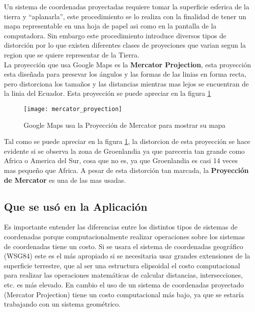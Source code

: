         Un sistema de coordenadas proyectadas requiere tomar la superficie esferica de la tierra y ``aplanarla'', este procedimiento se lo realiza con la finalidad de tener un mapa representable en una hoja de papel asi como en la pantalla de la computadora. Sin embargo este procedimiento introduce diversos tipos de distorci\'on por lo que existen diferentes clases de proyeciones que varian segun la region que se quiere representar de la Tierra.\\

        La proyecci\'on que usa Google Maps es la \textbf{Mercator Projection}, esta proyecci\'on esta dise\~nada para presevar los ángulos y las formas de las linias en forma recta, pero distorciona los tama\~nos y las distancias mientras mas lejos se encuentran de la linia del Ecuador. Esta proyecci\'on se puede apreciar en la figura \ref{fig:mercator_proyection}

        \begin{figure}[!hbp]
          \begin{center}
            \texttt{[image: mercator\_proyection]}
          \end{center}
          \caption[Sistema de coordenadas Proyectadas]{Google Maps usa la Proyección de Mercator para mostrar su mapa} 
          \label{fig:mercator_proyection}
        \end{figure}

        Tal como se puede apreciar en la figura \ref{fig:mercator_proyection}, la distorcion de esta proyecci\'on se hace evidente si se observa la zona de Groenlandia ya que pareceria tan grande como Africa o America del Sur, cosa que no es, ya que Groenlandia es casi 14 veces mas peque\~no que Africa. A pesar de esta distorci\'on tan marcada, la \textbf{Proyección de Mercator} es una de las mas usadas.
      \subsection{Que se us\'o en la Aplicaci\'on} %
      \label{sec:que_se_uso_en_la_aplicacion}
        Es importante entender las diferencias entre los distintos tipos de sistemas de coordenadas porque computacionalmente realizar operaciones sobre los sistemas de coordenadas tiene un costo.        
        Si se usara el sistema de coordenadas geográfico (WSG84) este es el más apropiado si se necesitaria usar grandes extensiones de la superficie terrestre, que al ser una estructura elipsoidal el costo computacional para realizar las operaciones matemáticas de calcular distancias, intersecciones, etc. es más elevado. En cambio el uso de un sistema de coordenadas proyectado (Mercator Projection) tiene un costo computacional más bajo, ya que se estaría trabajando con un sistema geométrico.\\

